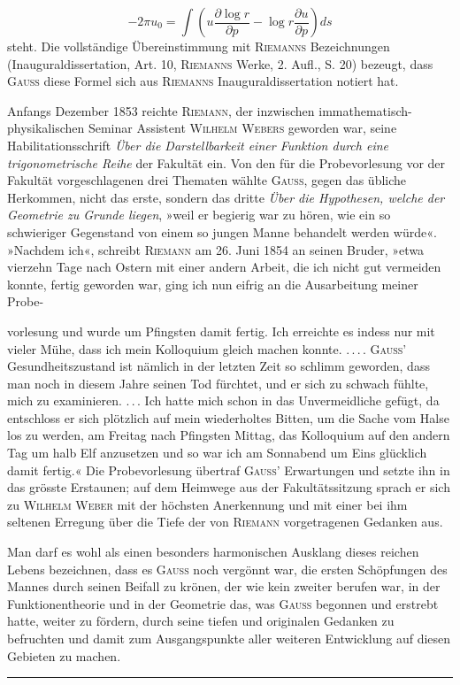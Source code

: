 \[
-2\pi u_0=\int\left(u\frac{\partial\log r}{\partial p}-\log r\frac{\partial u}{\partial p}\right)ds
\]
steht. Die vollständige Übereinstimmung mit \textsc{Riemanns} Bezeichnungen (Inauguraldissertation,
Art. 10, \textsc{Riemanns} Werke, 2. Aufl., S. 20) bezeugt, dass
\textsc{Gauss} diese Formel sich aus \textsc{Riemanns} Inauguraldissertation notiert hat.
\par
Anfangs Dezember 1853 reichte \textsc{Riemann}, der inzwischen im\linebreak mathematisch-physikalischen
Seminar Assistent \textsc{Wilhelm Webers} geworden war, seine Habilitationsschrift
\textit{Über die Darstellbarkeit einer Funktion durch eine trigonometrische
Reihe} der Fakultät ein. Von den für die Probevorlesung vor der Fakultät
vorgeschlagenen drei Thematen wählte \textsc{Gauss}, gegen das übliche Herkommen,
nicht das erste, sondern das dritte \textit{Über die Hypothesen, welche der Geometrie
zu Grunde liegen}, »weil er begierig war zu hören, wie ein so schwieriger Gegenstand
von einem so jungen Manne behandelt werden würde«. »Nachdem ich«,
schreibt \textsc{Riemann} am 26. Juni 1854 an seinen Bruder, »etwa vierzehn Tage
nach Ostern mit einer andern Arbeit, die ich nicht gut vermeiden konnte,
fertig geworden war, ging ich nun eifrig an die Ausarbeitung meiner Probe-\par
{}
\clearpage{}
\noindent vorlesung und wurde um Pfingsten damit fertig. Ich erreichte es indess nur
mit vieler Mühe, dass ich mein Kolloquium gleich machen konnte. \mbox{.\,.\,.\,.} \textsc{Gauss'}
Gesundheitszustand ist nämlich in der letzten Zeit so schlimm geworden, dass
man noch in diesem Jahre seinen Tod fürchtet, und er sich zu schwach fühlte,
mich zu examinieren. \mbox{.\,.\,.} Ich hatte mich schon in das Unvermeidliche gefügt,
da entschloss er sich plötzlich auf mein wiederholtes Bitten, um die Sache
vom Halse los zu werden, am Freitag nach Pfingsten Mittag, das Kolloquium
auf den andern Tag um halb Elf anzusetzen und so war ich am Sonnabend
um Eins glücklich damit fertig.« Die Probevorlesung übertraf \textsc{Gauss'} Erwartungen
und setzte ihn in das grösste Erstaunen; auf dem Heimwege aus
der Fakultätssitzung sprach er sich zu \textsc{Wilhelm Weber} mit der höchsten Anerkennung
und mit einer bei ihm seltenen Erregung über die Tiefe der von
\textsc{Riemann} vorgetragenen Gedanken aus.
\par
Man darf es wohl als einen besonders harmonischen Ausklang dieses
reichen Lebens bezeichnen, dass es \textsc{Gauss} noch vergönnt war, die ersten
Schöpfungen des Mannes durch seinen Beifall zu krönen, der wie kein zweiter
berufen war, in der Funktionentheorie und in der Geometrie das, was \textsc{Gauss}
begonnen und erstrebt hatte, weiter zu fördern, durch seine tiefen und originalen
Gedanken zu befruchten und damit zum Ausgangspunkte aller weiteren
Entwicklung auf diesen Gebieten zu machen.
\par\bigskip\begin{center}\rule{.25\linewidth}{.3pt}\end{center}
